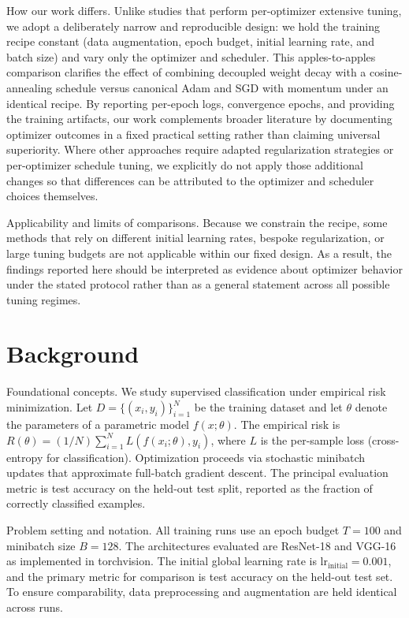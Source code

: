 \documentclass[journal,article,submit,pdftex,moreauthors]{Definitions/mdpi}
\begin{document}
How our work differs. Unlike studies that perform per-optimizer extensive tuning, we adopt a deliberately narrow and reproducible design: we hold the training recipe constant (data augmentation, epoch budget, initial learning rate, and batch size) and vary only the optimizer and scheduler. This apples-to-apples comparison clarifies the effect of combining decoupled weight decay with a cosine-annealing schedule versus canonical Adam and SGD with momentum under an identical recipe. By reporting per-epoch logs, convergence epochs, and providing the training artifacts, our work complements broader literature by documenting optimizer outcomes in a fixed practical setting rather than claiming universal superiority. Where other approaches require adapted regularization strategies or per-optimizer schedule tuning, we explicitly do not apply those additional changes so that differences can be attributed to the optimizer and scheduler choices themselves.

Applicability and limits of comparisons. Because we constrain the recipe, some methods that rely on different initial learning rates, bespoke regularization, or large tuning budgets are not applicable within our fixed design. As a result, the findings reported here should be interpreted as evidence about optimizer behavior under the stated protocol rather than as a general statement across all possible tuning regimes.

\section{Background}

Foundational concepts. We study supervised classification under empirical risk minimization. Let $D = \{{(x_i, y_i)}\}_{i=1}^{N}$ be the training dataset and let $\theta$ denote the parameters of a parametric model $f{(x; \theta)}$. The empirical risk is $R{(\theta)} = {(1/N)} \sum_{i=1}^{N} L{(f{(x_i; \theta)}, y_i)}$, where $L$ is the per-sample loss (cross-entropy for classification). Optimization proceeds via stochastic minibatch updates that approximate full-batch gradient descent. The principal evaluation metric is test accuracy on the held-out test split, reported as the fraction of correctly classified examples.

Problem setting and notation. All training runs use an epoch budget $T = 100$ and minibatch size $B = 128$. The architectures evaluated are ResNet-18 and VGG-16 as implemented in torchvision. The initial global learning rate is $\mathrm{lr}_{\mathrm{initial}} = 0.001$, and the primary metric for comparison is test accuracy on the held-out test set. To ensure comparability, data preprocessing and augmentation are held identical across runs.
\end{document}

